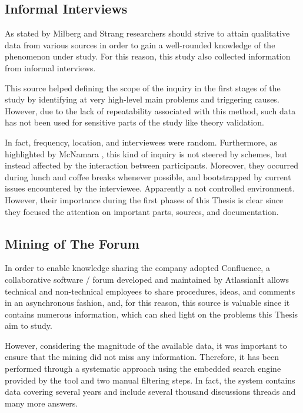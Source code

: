 \subsection{Informal Interviews}
As stated by Milberg and Strang \cite{informal_interview} researchers should strive to attain qualitative data from various sources in order to gain a well-rounded knowledge of the phenomenon under study. For this reason, this study also collected information from informal interviews.

This source helped defining the scope of the inquiry in the first stages of the study by identifying at very high-level main problems and triggering causes. However, due to the lack of repeatability associated with this method, such data has not been used for sensitive parts of the study like theory validation.

In fact, frequency, location, and interviewees were random. Furthermore, as highlighted by McNamara \cite{general_guidelines_for_interview}, this kind of inquiry is not steered by schemes, but instead affected by the interaction between participants. Moreover, they occurred during lunch and coffee breaks whenever possible, and bootstrapped by current issues encountered by the interviewee. Apparently a not controlled environment. However, their importance during the first phases of this Thesis is clear since they focused the attention on important parts, sources, and documentation.

\subsection{Mining of The Forum} \label{mining_forum}
In order to enable knowledge sharing the company adopted Confluence, a collaborative software / forum developed and maintained by Atlassian\texttrademark\. It allows technical and non-technical employees to share procedures, ideas, and comments in an asynchronous fashion, and, for this reason, this source is valuable since it contains numerous information, which can shed light on the problems this Thesis aim to study.

However, considering the magnitude of the available data, it was important to ensure that the mining did not miss any information. Therefore, it has been performed through a systematic approach using the embedded search engine provided by the tool and two manual filtering steps. In fact, the system contains data covering several years and include several thousand discussions threads and many more answers.

